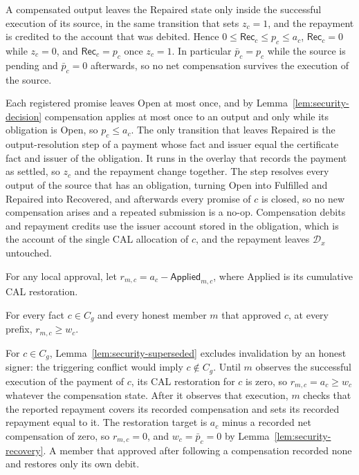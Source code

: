 \begin{lemma}
\label{lem:security-recovery}
A compensated output leaves the Repaired state only inside the successful
execution of its source, in the same transition that sets $z_c=1$, and
the repayment is credited to the account that was debited. Hence
$0\le\mathsf{Rec}_c\le p_c\le a_c$, $\mathsf{Rec}_c=0$ while $z_c=0$,
and $\mathsf{Rec}_c=p_c$ once $z_c=1$. In particular $\bar p_c=p_c$ while
the source is pending and $\bar p_c=0$ afterwards, so no net compensation
survives the execution of the source.
\end{lemma}
\begin{IEEEproof}
Each registered promise leaves Open at most once, and by Lemma~\ref{lem:security-decision} compensation applies at most once to an output and only while its obligation is Open, so $p_c\le a_c$. The only transition that leaves Repaired is the output-resolution step of a payment whose fact and issuer equal the certificate fact and issuer of the obligation. It runs in the overlay that records the payment as settled, so $z_c$ and the repayment change together. The step resolves every output of the source that has an obligation, turning Open into Fulfilled and Repaired into Recovered, and afterwards every promise of $c$ is closed, so no new compensation arises and a repeated submission is a no-op. Compensation debits and repayment credits use the issuer account stored in the obligation, which is the account of the single CAL allocation of $c$, and the repayment leaves $\mathcal D_x$ untouched.
\end{IEEEproof}

For any local approval, let $r_{m,c}=a_c-\mathsf{Applied}_{m,c}$, where Applied is its cumulative CAL restoration.

\begin{lemma}
\label{lem:security-witness}
For every fact $c\in C_g$ and every honest member $m$ that approved $c$,
at every prefix,
$r_{m,c}\ge w_c$.
\end{lemma}
\begin{IEEEproof}
For $c\in C_g$, Lemma~\ref{lem:security-superseded} excludes invalidation by an honest signer: the triggering conflict would imply $c\notin C_g$.
Until $m$ observes the successful execution of the payment of $c$, its CAL restoration for $c$ is zero, so $r_{m,c}=a_c\ge w_c$ whatever the compensation state. After it observes that execution, $m$ checks that the reported repayment covers its recorded compensation and sets its recorded repayment equal to it. The restoration target is $a_c$ minus a recorded net compensation of zero, so $r_{m,c}=0$, and $w_c=\bar p_c=0$ by Lemma~\ref{lem:security-recovery}. A member that approved after following a compensation recorded none and restores only its own debit.
\end{IEEEproof}

